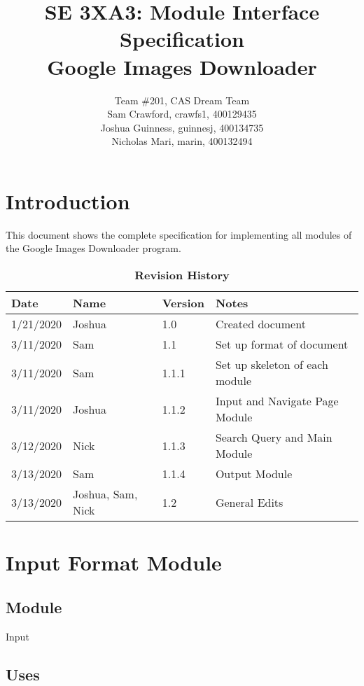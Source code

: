 \documentclass{article}
\title{SE 3XA3: Module Interface Specification\\Google Images Downloader}
\author{Team \#201, CAS Dream Team
		\\ Sam Crawford, crawfs1, 400129435
		\\ Joshua Guinness, guinnesj, 400134735
		\\ Nicholas Mari, marin, 400132494
}
\begin{document}
\maketitle




\section*{Introduction}

This document shows the complete specification for implementing all modules of the Google Images Downloader program.

\begin{table}[bp]
\begin{tabularx}{\textwidth}{lllp{7.5cm}}
\toprule {\bf Date} & {\bf Name} & {\bf Version} & {\bf Notes}\\
\midrule
1/21/2020 & Joshua & 1.0 & Created document\\
3/11/2020 & Sam & 1.1 & Set up format of document\\
3/11/2020 & Sam & 1.1.1 & Set up skeleton of each module\\
3/11/2020 & Joshua & 1.1.2 & Input and Navigate Page Module\\
3/12/2020 & Nick & 1.1.3 & Search Query and Main Module\\
3/13/2020 & Sam & 1.1.4 & Output Module\\
3/13/2020 & Joshua, Sam, Nick & 1.2 & General Edits\\
\bottomrule
\end{tabularx}
\caption{\bf Revision History}
\end{table}

\newpage

\section*{Input Format Module}

\subsection* {Module}

Input

\subsection* {Uses}
\end{document}
